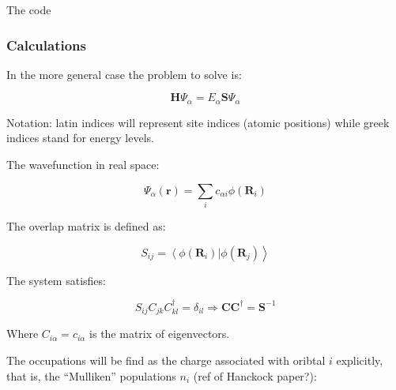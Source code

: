 \documentclass[amsmath,%
amssymb,prb,superscriptaddress]{revtex4}
\begin{document}
The code


\subsubsection{Calculations}

%
%

In the more general case the problem to solve is:

\begin{equation}
\textbf{H}\Psi_{\alpha} = E_{\alpha}\textbf{S}\Psi_{\alpha}
\end{equation}

Notation: latin indices will represent site indices (atomic positions) while greek indices stand for energy levels.

The wavefunction  in real space:

\begin{equation}\label{eq:TBWF}
\Psi_{\alpha}(\textbf{r}) = \sum_{i} c_{\alpha i}\phi(\textbf{R}_{i})
\end{equation}

The overlap matrix is defined as:

\begin{equation}
S_{ij} = \left\langle\phi(\textbf{R}_{i}) \right|\left. \phi(\textbf{R}_{j}) \right\rangle
\end{equation}

The system satisfies:

\begin{equation}
S_{ij}C_{jk}C^{\dagger}_{kl} = \delta_{il} \Rightarrow \textbf{C}\textbf{C}^{\dagger} = \textbf{S}^{-1}
\end{equation}

Where $C_{i\alpha} = c_{i\alpha}$ is the matrix of eigenvectors.

%

The occupations will be find as the charge associated with oribtal $i$ explicitly, that is, the ``Mulliken'' populations $n_{i}$ (ref of Hanckock paper?):
\end{document}
